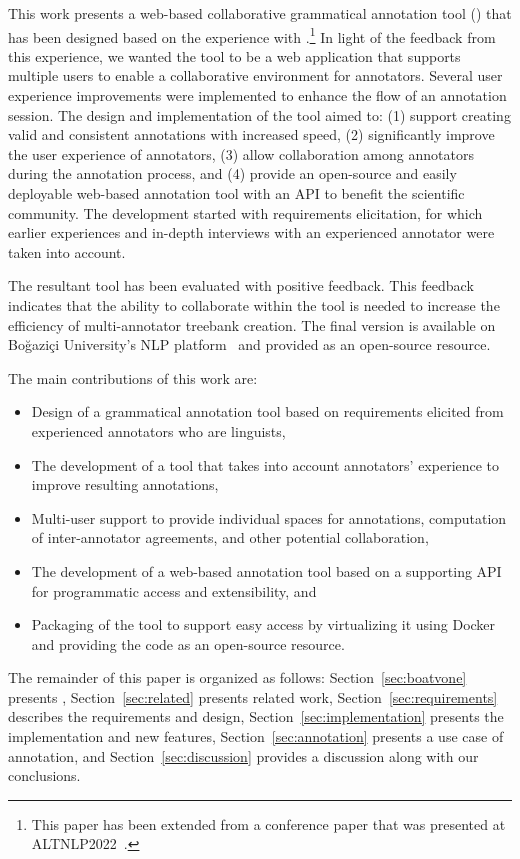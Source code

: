 This work presents a web-based collaborative grammatical annotation tool (\boatvtwo) that has been designed based on the experience with \boatvone.\footnote{This paper has been extended from a conference paper that was presented at ALTNLP2022~\cite{ALTNLP}.}
In light of the feedback from this experience, we wanted the tool to be a web application that supports multiple users to enable a collaborative environment for annotators.
Several user experience improvements were implemented to enhance the flow of an annotation session.
The design and implementation of the tool aimed to: (1) support creating valid and consistent annotations with increased speed, (2) significantly improve the user experience of annotators, (3) allow collaboration among annotators during the annotation process, and (4) provide an open-source and easily deployable web-based annotation tool with an API to benefit the scientific community.
The development started with requirements elicitation, for which earlier experiences and in-depth interviews with an experienced annotator were taken into account.

The resultant tool has been evaluated with positive feedback.
This feedback indicates that the ability to collaborate within the tool is needed to increase the efficiency of multi-annotator treebank creation.
The final version is available on Boğaziçi University's NLP platform~\cite{TULAP} and provided as an open-source resource.

The main contributions of this work are:
\begin{itemize}
\setlength\itemsep{0em}
        \item Design of a grammatical annotation tool based on requirements elicited from experienced annotators who are linguists,
        \item The development of a tool that takes into account annotators' experience to improve resulting annotations,
        \item Multi-user support to provide individual spaces for annotations, computation of inter-annotator agreements, and other potential collaboration,
        \item The development of a web-based annotation tool based on a supporting API for programmatic access and extensibility, and
        \item Packaging of the tool to support easy access by virtualizing it using Docker~\cite{docker} and providing the code as an open-source resource.
\end{itemize}

The remainder of this paper is organized as follows:
Section~\ref{sec:boatvone} presents \boatvone,
Section~\ref{sec:related} presents related work,
Section~\ref{sec:requirements} describes the requirements and design,
Section~\ref{sec:implementation} presents the implementation and new features,
Section~\ref{sec:annotation} presents a use case of annotation, and
Section~\ref{sec:discussion} provides a discussion along with our conclusions.
